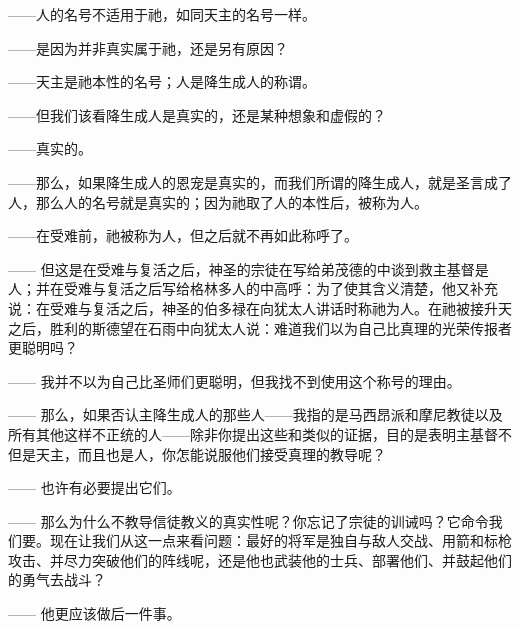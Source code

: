 ——人的名号不适用于祂，如同天主的名号一样。\par

——是因为并非真实属于祂，还是另有原因？\par

——天主是祂本性的名号；人是降生成人的称谓。\par

——但我们该看降生成人是真实的，还是某种想象和虚假的？\par

——真实的。\par

——那么，如果降生成人的恩宠是真实的，而我们所谓的降生成人，就是圣言成了人，那么人的名号就是真实的；因为祂取了人的本性后，被称为人。\par

——在受难前，祂被称为人，但之后就不再如此称呼了。\par

—— 但这是在受难与复活之后，神圣的宗徒在写给弟茂德的中谈到救主基督是人；并在受难与复活之后写给格林多人的中高呼：为了使其含义清楚，他又补充说：在受难与复活之后，神圣的伯多禄在向犹太人讲话时称祂为人。在祂被接升天之后，胜利的斯德望在石雨中向犹太人说：难道我们以为自己比真理的光荣传报者更聪明吗？\par

—— 我并不以为自己比圣师们更聪明，但我找不到使用这个称号的理由。\par

—— 那么，如果否认主降生成人的那些人——我指的是马西昂派和摩尼教徒以及所有其他这样不正统的人——除非你提出这些和类似的证据，目的是表明主基督不但是天主，而且也是人，你怎能说服他们接受真理的教导呢？\par

—— 也许有必要提出它们。\par

—— 那么为什么不教导信徒教义的真实性呢？你忘记了宗徒的训诫吗？它命令我们要。现在让我们从这一点来看问题：最好的将军是独自与敌人交战、用箭和标枪攻击、并尽力突破他们的阵线呢，还是他也武装他的士兵、部署他们、并鼓起他们的勇气去战斗？\par

—— 他更应该做后一件事。\par


